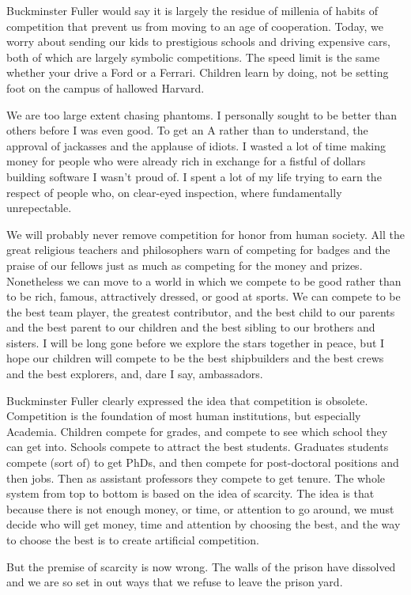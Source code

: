 \documentclass[
	fontsize=10pt, %
	twoside=false, %
	secnumdepth=1, %
]{kaobook}
\begin{document}
Buckminster Fuller would say it is largely the residue
of millenia of habits of competition that prevent us
from moving to an age of cooperation.
Today, we worry about sending our kids to prestigious schools
and driving expensive cars, both of which are largely
symbolic competitions. The speed limit is the same
whether your drive a Ford or a Ferrari.
Children learn by doing, not be setting foot on
the campus of hallowed Harvard.

We are too large extent chasing phantoms.
I personally sought to be better than others before I was even good.
To get an A rather than to understand,
the approval of jackasses and
the applause of idiots.
I wasted a lot of time making money for people
who were already rich in exchange for a fistful of dollars
building software I wasn't proud of.
I spent a lot of my life trying to earn the respect of
people who, on clear-eyed inspection, where fundamentally
unrepectable.

We will probably never remove competition for honor
from human society. All the great religious
teachers and philosophers warn of competing for badges and the
praise of our fellows just as much as competing for the
money and prizes.
Nonetheless we can move to a world in which we compete
to be good rather than to be rich, famous,
attractively dressed, or good at sports.
We can compete to be the best team player,
the greatest contributor, and
the best child to our parents and the best parent to
our children and the best sibling to our brothers and sisters.
I will be long gone before we explore the stars together in
peace, but I hope our children will compete to be the best
shipbuilders and the best crews and the best explorers,
and, dare I say, ambassadors.

Buckminster Fuller clearly expressed the idea that competition is obsolete.
Competition is the foundation of most human institutions, but especially Academia.
Children compete for grades, and compete to see which school they can get into.
Schools compete to attract the best students. Graduates students compete (sort of)
to get PhDs, and then compete for post-doctoral positions and then jobs. Then
as assistant professors they compete to get tenure.
The whole system from top to bottom is based on the idea of scarcity.
The idea is that because there is not enough money, or time, or attention to
go around, we must decide who will get money, time and attention by choosing the
best, and the way to choose the best is to create artificial competition.

But the premise of scarcity is now wrong. The walls of the prison have
dissolved and we are so set in out ways that we refuse to leave the prison yard.
\end{document}
